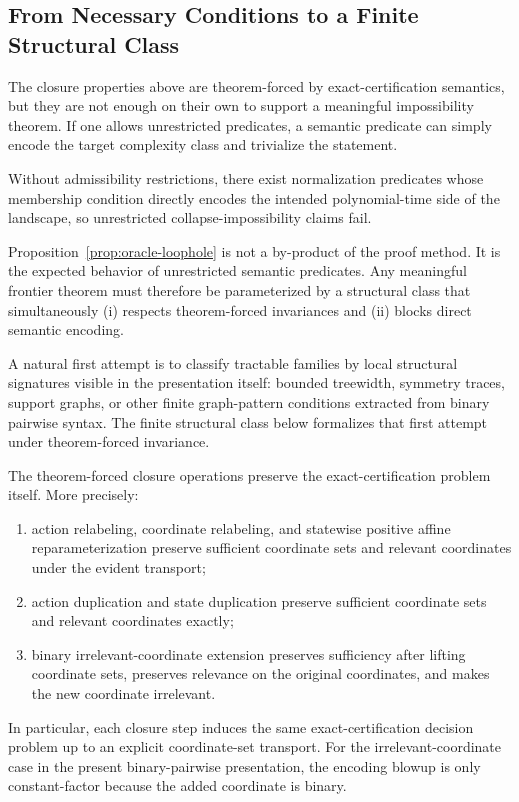 \subsection*{From Necessary Conditions to a Finite Structural Class}

The closure properties above are theorem-forced by exact-certification semantics, but they are not enough on their own to support a meaningful impossibility theorem. If one allows unrestricted predicates, a semantic predicate can simply encode the target complexity class and trivialize the statement.

\begin{proposition}\label{prop:oracle-loophole}
Without admissibility restrictions, there exist normalization predicates whose membership condition directly encodes the intended polynomial-time side of the landscape, so unrestricted collapse-impossibility claims fail.
\end{proposition}

Proposition~\ref{prop:oracle-loophole} is not a by-product of the proof method. It is the expected behavior of unrestricted semantic predicates. Any meaningful frontier theorem must therefore be parameterized by a structural class that simultaneously (i) respects theorem-forced invariances and (ii) blocks direct semantic encoding.

A natural first attempt is to classify tractable families by local structural signatures visible in the presentation itself: bounded treewidth, symmetry traces, support graphs, or other finite graph-pattern conditions extracted from binary pairwise syntax. The finite structural class below formalizes that first attempt under theorem-forced invariance.

\begin{proposition}\label{prop:closure-operations-preserve-certification}
The theorem-forced closure operations preserve the exact-certification problem itself. More precisely:
\begin{enumerate}
\item action relabeling, coordinate relabeling, and statewise positive affine reparameterization preserve sufficient coordinate sets and relevant coordinates under the evident transport;
\item action duplication and state duplication preserve sufficient coordinate sets and relevant coordinates exactly;
\item binary irrelevant-coordinate extension preserves sufficiency after lifting coordinate sets, preserves relevance on the original coordinates, and makes the new coordinate irrelevant.
\end{enumerate}
In particular, each closure step induces the same exact-certification decision problem up to an explicit coordinate-set transport. For the irrelevant-coordinate case in the present binary-pairwise presentation, the encoding blowup is only constant-factor because the added coordinate is binary.
\end{proposition}


